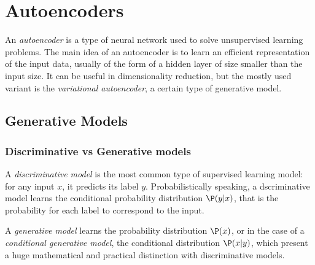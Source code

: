 \newpage
\section{Autoencoders}
An \emph{autoencoder} is a type of neural network used to solve unsupervised learning problems. The main idea of an autoencoder is to learn an efficient representation of the input data, usually of the form of a hidden layer of size smaller than the input size. It can be useful in dimensionality reduction, but the mostly used variant is the \emph{variational autoencoder}, a certain type of generative model.

\subsection{Generative Models}
\subsubsection{Discriminative vs Generative models}
A \emph{discriminative model} is the most common type of supervised learning model: for any input $x$, it predicts its label $y$. Probabilistically speaking, a dscriminative model learns the conditional probability distribution $\P(y|x)$, that is the probability for each label to correspond to the input. 

A \emph{generative model} learns the probability distribution $\P(x)$, or in the case of a \emph{conditional generative model}, the conditional distribution $\P(x|y)$, which present a huge mathematical and practical distinction with discriminative models.


\newpage